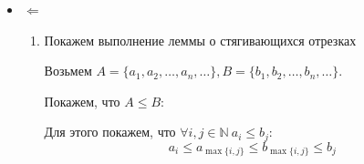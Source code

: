 \documentclass[14pt]{extarticle}
\numberwithin{equation}{section}
\newcommand{\NN}{\mathbb{N}}
\begin{document}
\begin{itemize}
            Действительно, возьмем какое-нибудь число \( b \in B \cap I_n \)
            (такое обязательно есть, так как \( I_n \cap A, I_n \cap B \neq \varnothing \)).
            \( A \leq B \Rightarrow \forall a \in A \ a \leq b \leq b_n \),
            но \( \left( \frac{a_n + b_n}{2}, b_n \right] \cap A = \varnothing \),
            поэтому \( \forall a \in A \ a \leq \frac{a_n + b_n}{2} \).

            Аналогично \( \forall b \in B \ \frac{a_n + b_n}{2} \leq b \).

            Либо когда-то найдем разделитель, либо получим последовательность вложенных отрезков.

            По Бернулли \( 2^n = (1 + 1)^n \geq 1 + n \)

            \( | I_n | = \frac{b_1 - a_1}{2^{n - 1}} \leq \frac{1}{n} \)

            По аксиоме Архимеда \( \forall \varepsilon > 0 \ \exists n : \frac{1}{n} < \varepsilon \).

            Значит длина отрезка стремится к нулю \( \Rightarrow \{ I_n \}_{n = 1}^{+ \infty} \) ---
            последовательность стягивающихся отрезков.

            А у таких отрезков всегда есть общая точка \( c \).

            Предположим, что это не разделитель:

            Не умаляя общности, \( \exists a' \in A : c < a' \).
            Тогда \( a_n < c < a' \leq b_n \) (выше показывалось, почему \( A \leq \{ b_n \} \)).
            Получаем, что \( | I_n | = b_n - a_n > a' - c \),
            то есть последовательность отрезков не является стягивающейся --- противоречие.
        \item
            \( \Leftarrow \)

            \begin{enumerate}
                \item
                    Покажем выполнение леммы о стягивающихся отрезках

                    Возьмем \( A = \{ a_1, a_2, \ldots, a_n, \ldots \}, B = \{ b_1, b_2, \ldots, b_n, \ldots \} \).

                    Покажем, что \( A \leq B \):

                    Для этого покажем, что \( \forall i, j \in \NN \ a_i \leq b_j \):
                    \[
                        a_i \leq a_{ \max \{ i, j \} } \leq b_{ \max\{ i, j \} } \leq b_j
                    \]


\end{enumerate}
\end{itemize}
\end{document}
